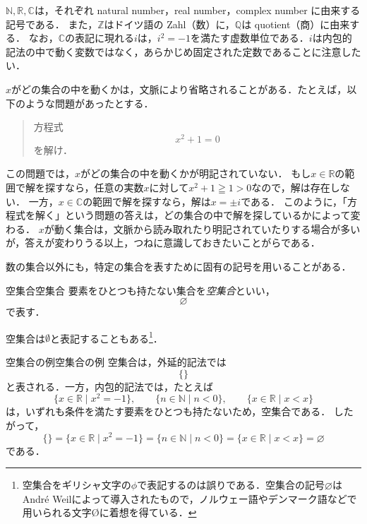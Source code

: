 $\mathbb{N},\mathbb{R},\mathbb{C}$は，それぞれ natural number，real number，complex number に由来する記号である．
また，$\mathbb{Z}$はドイツ語の Zahl（数）に，$\mathbb{Q}$は quotient（商）に由来する．
なお，$\mathbb{C}$の表記に現れる$i$は，$i^2 = -1$を満たす虚数単位である．$i$は内包的記法の中で動く変数ではなく，あらかじめ固定された定数であることに注意したい．


$x$がどの集合の中を動くかは，文脈により省略されることがある．たとえば，以下のような問題があったとする．
\begin{quotation}
  方程式
  \[
    x^2 + 1 = 0
  \]
  を解け．
\end{quotation}
この問題では，$x$がどの集合の中を動くかが明記されていない．
もし$x \in \mathbb{R}$の範囲で解を探すなら，任意の実数$x$に対して$x^2 + 1 \geqq 1 > 0$なので，解は存在しない．
一方，$x \in \mathbb{C}$の範囲で解を探すなら，解は$x = \pm i$である．
このように，「方程式を解く」という問題の答えは，どの集合の中で解を探しているかによって変わる．
$x$が動く集合は，文脈から読み取れたり明記されていたりする場合が多いが，答えが変わりうる以上，つねに意識しておきたいことがらである．

数の集合以外にも，特定の集合を表すために固有の記号を用いることがある．

\begin{definition}{空集合}{空集合}
  要素をひとつも持たない集合を\emph{空集合}といい，
  \[
    \varnothing
  \]
  で表す．
\end{definition}

空集合は$\emptyset$と表記することもある\footnote{空集合をギリシャ文字の$\phi$で表記するのは誤りである．空集合の記号$\varnothing$はAndré Weilによって導入されたもので，ノルウェー語やデンマーク語などで用いられる文字Øに着想を得ている．}．

\begin{example}{空集合の例}{空集合の例}
  空集合は，外延的記法では
  \[
    \{\}
  \]
  と表される．一方，内包的記法では，たとえば
  \[
    \{x \in \mathbb{R} \mid x^2=-1\},
    \qquad
    \{n \in \mathbb{N} \mid n<0\},
    \qquad
    \{x \in \mathbb{R} \mid x<x\}
  \]
  は，いずれも条件を満たす要素をひとつも持たないため，空集合である．
  したがって，
  \[
    \{\}
    =
    \{x \in \mathbb{R} \mid x^2=-1\}
    =
    \{n \in \mathbb{N} \mid n<0\}
    =
    \{x \in \mathbb{R} \mid x<x\}
    =
    \varnothing
  \]
  である．
\end{example}

